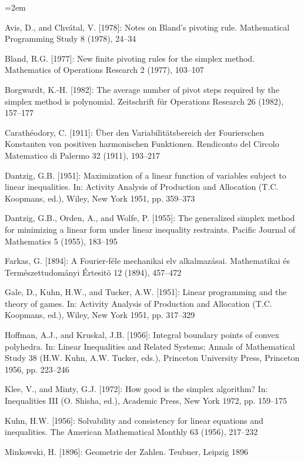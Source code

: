 \begingroup\emergencystretch=2em
\begin{description}[font=\normalfont,leftmargin=1em,itemsep=5pt]
\item Avis, D., and Chvátal, V. [1978]: Notes on Bland's pivoting rule. Mathematical Programming Study 8 (1978), 24--34
\item Bland, R.G. [1977]: New finite pivoting rules for the simplex method. Mathematics of Operations Research 2 (1977), 103--107
\item Borgwardt, K.-H. [1982]: The average number of pivot steps required by the simplex method is polynomial. Zeitschrift für Operations Research 26 (1982), 157--177
\item Carathéodory, C. [1911]: Über den Variabilitätsbereich der Fourierschen Konstanten von positiven harmonischen Funktionen. Rendiconto del Circolo Matematico di Palermo 32 (1911), 193--217
\item Dantzig, G.B. [1951]: Maximization of a linear function of variables subject to linear inequalities. In: Activity Analysis of Production and Allocation (T.C. Koopmans, ed.), Wiley, New York 1951, pp. 359--373
\item Dantzig, G.B., Orden, A., and Wolfe, P. [1955]: The generalized simplex method for minimizing a linear form under linear inequality restraints. Pacific Journal of Mathematics 5 (1955), 183--195
\item Farkas, G. [1894]: A Fourier-féle mechanikai elv alkalmazásai. Mathematikai és Természettudományi Értesitö 12 (1894), 457--472
\item Gale, D., Kuhn, H.W., and Tucker, A.W. [1951]: Linear programming and the theory of games. In: Activity Analysis of Production and Allocation (T.C. Koopmans, ed.), Wiley, New York 1951, pp. 317--329
\item Hoffman, A.J., and Kruskal, J.B. [1956]: Integral boundary points of convex polyhedra. In: Linear Inequalities and Related Systems; Annals of Mathematical Study 38 (H.W. Kuhn, A.W. Tucker, eds.), Princeton University Press, Princeton 1956, pp. 223--246
\item Klee, V., and Minty, G.J. [1972]: How good is the simplex algorithm? In: Inequalities III (O. Shisha, ed.), Academic Press, New York 1972, pp. 159--175
\item Kuhn, H.W. [1956]: Solvability and consistency for linear equations and inequalities. The American Mathematical Monthly 63 (1956), 217--232
\item Minkowski, H. [1896]: Geometrie der Zahlen. Teubner, Leipzig 1896

\end{description}

